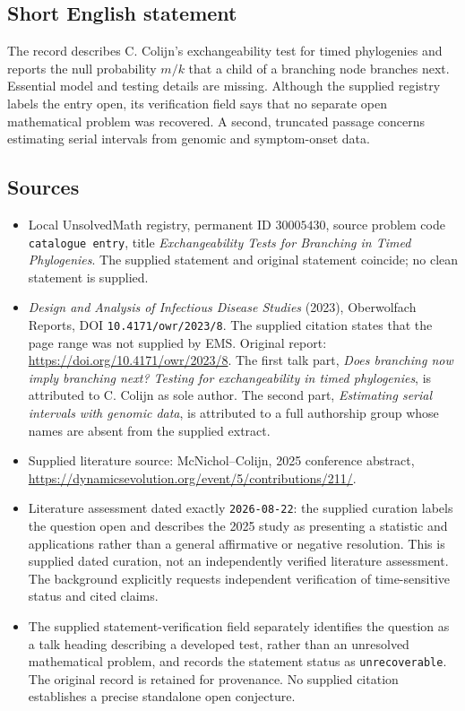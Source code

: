 \documentclass[11pt]{article}
\begin{document}
\subsection{Short English statement}
The record describes C. Colijn's exchangeability test for timed phylogenies and reports the null probability \(m/k\) that a child of a branching node branches next. Essential model and testing details are missing. Although the supplied registry labels the entry open, its verification field says that no separate open mathematical problem was recovered. A second, truncated passage concerns estimating serial intervals from genomic and symptom-onset data.
\subsection{Sources}
\begin{itemize}
\item Local UnsolvedMath registry, permanent ID \(30005430\), source problem code \texttt{catalogue entry}, title \emph{Exchangeability Tests for Branching in Timed Phylogenies}. The supplied statement and original statement coincide; no clean statement is supplied.
\item \emph{Design and Analysis of Infectious Disease Studies} (2023), Oberwolfach Reports, DOI \texttt{10.4171/owr/2023/8}. The supplied citation states that the page range was not supplied by EMS. Original report: \url{https://doi.org/10.4171/owr/2023/8}. The first talk part, \emph{Does branching now imply branching next? Testing for exchangeability in timed phylogenies}, is attributed to C. Colijn as sole author. The second part, \emph{Estimating serial intervals with genomic data}, is attributed to a full authorship group whose names are absent from the supplied extract.
\item Supplied literature source: McNichol--Colijn, 2025 conference abstract, \url{https://dynamicsevolution.org/event/5/contributions/211/}.
\item Literature assessment dated exactly \texttt{2026-08-22}: the supplied curation labels the question open and describes the 2025 study as presenting a statistic and applications rather than a general affirmative or negative resolution. This is supplied dated curation, not an independently verified literature assessment. The background explicitly requests independent verification of time-sensitive status and cited claims.
\item The supplied statement-verification field separately identifies the question as a talk heading describing a developed test, rather than an unresolved mathematical problem, and records the statement status as \texttt{unrecoverable}. The original record is retained for provenance. No supplied citation establishes a precise standalone open conjecture.
\end{itemize}
\end{document}

